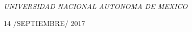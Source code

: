 \documentclass[a4paper, 11pt, oneside]{book} %
\begin{document}
\begin{titlepage}
	\textit{UNIVERSIDAD NACIONAL AUTONOMA DE MEXICO} %
	
	\vfill %
	
	
	
	\vspace{0.3\baselineskip} %
	
	14 /SEPTIEMBRE/ 2017 %
	

\end{titlepage}

\newpage
\end{document}
